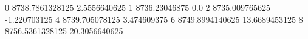 0 8738.7861328125 2.5556640625
1 8736.23046875 0.0
2 8735.009765625 -1.220703125
4 8739.705078125 3.474609375
6 8749.8994140625 13.6689453125
8 8756.5361328125 20.3056640625
